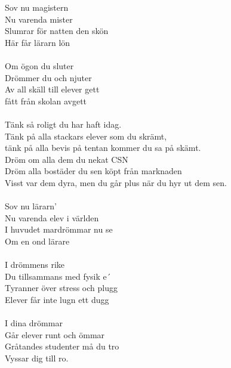 \documentclass[a6paper, 10pt, twoside]{article}
\begin{document}

\begin{center}
\end{center}
\begin{lyrics}
Sov nu magistern\\
Nu varenda mister\\
Slumrar för natten den skön\\
Här får lärarn lön\\
\vspace{5pt}\\
Om ögon du sluter\\
Drömmer du och njuter\\
Av all skäll till elever gett\\
fått från skolan avgett\\
\vspace{5pt}\\
Tänk så roligt du har haft idag.\\
Tänk på alla stackars elever som du skrämt,\\
tänk på alla bevis på tentan kommer du sa på skämt.\\
Dröm om alla dem du nekat CSN\\
Dröm alla bostäder du sen köpt från marknaden\\
Visst var dem dyra, men du går plus när du hyr ut dem sen.\\
\vspace{5pt}\\
Sov nu lärarn’\\
Nu varenda elev i världen\\
I huvudet mardrömmar nu se\\
Om en ond lärare\\
\vspace{5pt}\\
I drömmens rike\\
Du tillsammans med fysik e´\\
Tyranner över stress och plugg\\
Elever får inte lugn ett dugg\\
\vspace{5pt}\\
I dina drömmar\\
Går elever runt och ömmar\\
Gråtandes studenter må du tro\\
Vyssar dig till ro.\\
\vspace{5pt}\\

\end{lyrics}
\end{document}
